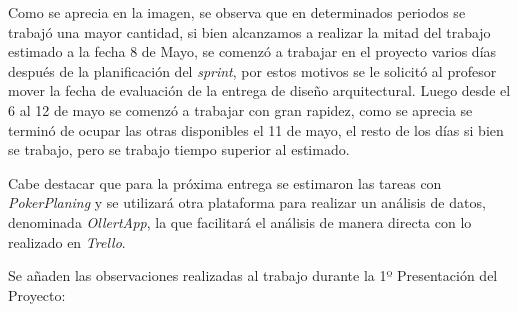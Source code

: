 \documentclass{memoria}
\begin{document}
Como se aprecia en la imagen, se observa que en determinados periodos se trabajó una mayor cantidad, si bien alcanzamos a realizar la mitad del trabajo estimado a la fecha 8 de Mayo, se comenzó a trabajar en el proyecto varios días después de la planificación del \textsl{sprint}, por estos motivos se le solicitó al profesor mover la fecha de evaluación de la entrega de diseño arquitectural. Luego desde el 6 al 12 de mayo se comenzó a trabajar con gran rapidez, como se aprecia se terminó de ocupar las otras disponibles el 11 de mayo, el resto de los días si bien se trabajo, pero se trabajo tiempo superior al estimado.

Cabe destacar que para la próxima entrega se estimaron las tareas con \textsl{PokerPlaning} y se utilizará otra plataforma para realizar un análisis de datos, denominada \textsl{OllertApp}, la que facilitará el análisis de manera directa con lo realizado en \textsl{Trello}.


Se añaden las observaciones realizadas al trabajo durante la 1º Presentación del Proyecto:


\end{document}
